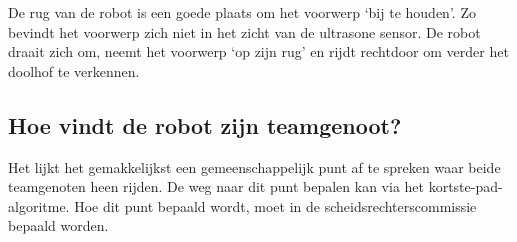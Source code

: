\documentclass{peno}
\begin{document}
De rug van de robot is een goede plaats om het voorwerp `bij te houden'. Zo bevindt het voorwerp zich niet in het zicht van de ultrasone sensor. De robot draait zich om, neemt het voorwerp `op zijn rug' en rijdt rechtdoor om verder het doolhof te verkennen.



\subsection*{Hoe vindt de robot zijn teamgenoot?}
Het lijkt het gemakkelijkst een gemeenschappelijk punt af te spreken waar beide teamgenoten heen rijden. De weg naar dit punt bepalen kan via het kortste-pad-algoritme. Hoe dit punt bepaald wordt, moet in de scheidsrechterscommissie bepaald worden.

\end{document}
